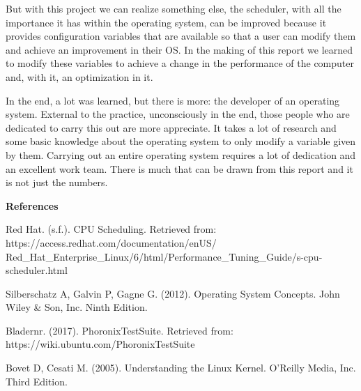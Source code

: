 \documentclass[english]{article}
\begin{document}
	But with this project we can realize something else, the scheduler, with all the importance it has within the operating system, can be improved because it provides configuration variables that are available so that a user can modify them and achieve an improvement in their OS. In the making of this report we learned to modify these variables to achieve a change in the performance of the computer and, with it, an optimization in it.

	In the end, a lot was learned, but there is more: the developer of an operating system. External to the practice, unconsciously in the end, those people who are dedicated to carry this out are more appreciate. It takes a lot of research and some basic knowledge about the operating system to only modify a variable given by them. Carrying out an entire operating system requires a lot of dedication and an excellent work team. There is much that can be drawn from this report and it is not just the numbers.

\vspace{8cm}
\begin{center}
{\bf References}
\end{center}

Red Hat. (s.f.). CPU Scheduling. Retrieved from: https://access.redhat.com/documentation/enUS/
Red\_Hat\_Enterprise\_Linux/6/html/Performance\_Tuning\_Guide/s-cpu-scheduler.html
    
\vspace{0.3cm}
Silberschatz A, Galvin P, Gagne G. (2012). Operating System Concepts. John Wiley \& Son, Inc. Ninth Edition.

\vspace{0.3cm}
Bladernr. (2017). PhoronixTestSuite. Retrieved from: https://wiki.ubuntu.com/PhoronixTestSuite

\vspace{0.3cm}
Bovet D, Cesati M. (2005). Understanding the Linux Kernel. O'Reilly Media, Inc. Third Edition.
\end{document}
